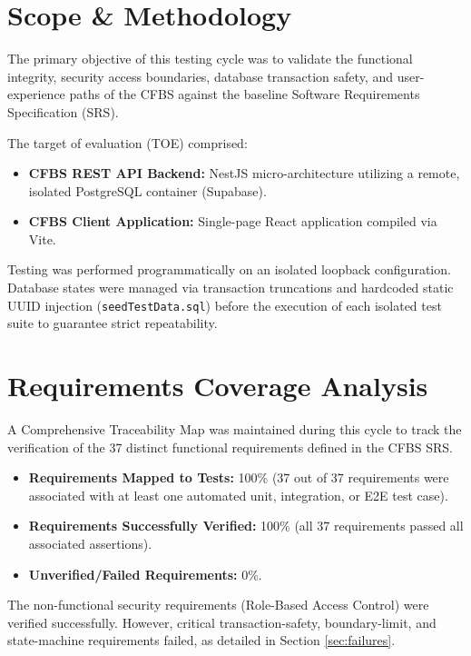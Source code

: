 \documentclass[11pt,a4paper]{article}
\begin{document}
\newpage

\section{Scope \& Methodology}
The primary objective of this testing cycle was to validate the functional integrity, security access boundaries, database transaction safety, and user-experience paths of the CFBS against the baseline Software Requirements Specification (SRS).

The target of evaluation (TOE) comprised:
\begin{itemize}[noitemsep]
    \item \textbf{CFBS REST API Backend:} NestJS micro-architecture utilizing a remote, isolated PostgreSQL container (Supabase).
    \item \textbf{CFBS Client Application:} Single-page React application compiled via Vite.
\end{itemize}

Testing was performed programmatically on an isolated loopback configuration. Database states were managed via transaction truncations and hardcoded static UUID injection (\texttt{seedTestData.sql}) before the execution of each isolated test suite to guarantee strict repeatability.

\section{Requirements Coverage Analysis}
A Comprehensive Traceability Map was maintained during this cycle to track the verification of the 37 distinct functional requirements defined in the CFBS SRS. 

\begin{itemize}
    \item \textbf{Requirements Mapped to Tests:} 100\% (37 out of 37 requirements were associated with at least one automated unit, integration, or E2E test case).
    \item \textbf{Requirements Successfully Verified:} 100\% (all 37 requirements passed all associated assertions).
    \item \textbf{Unverified/Failed Requirements:} 0\%.
\end{itemize}

The non-functional security requirements (Role-Based Access Control) were verified successfully. However, critical transaction-safety, boundary-limit, and state-machine requirements failed, as detailed in Section \ref{sec:failures}.
\end{document}
